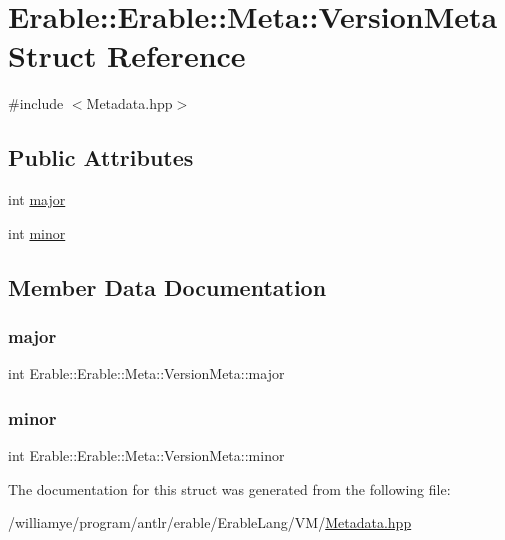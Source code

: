 \hypertarget{struct_erable_1_1_erable_1_1_meta_1_1_version_meta}{}\section{Erable\+::Erable\+::Meta\+::Version\+Meta Struct Reference}
\label{struct_erable_1_1_erable_1_1_meta_1_1_version_meta}


{\ttfamily \#include $<$Metadata.\+hpp$>$}

\subsection*{Public Attributes}
\begin{DoxyCompactItemize}
\item 
int \mbox{\hyperlink{struct_erable_1_1_erable_1_1_meta_1_1_version_meta_a7295ed6eb241d786c7cf94b9886d3a38}{major}}
\item 
int \mbox{\hyperlink{struct_erable_1_1_erable_1_1_meta_1_1_version_meta_a408a0b0d5c003f48d1e4386e9e0bac5d}{minor}}
\end{DoxyCompactItemize}


\subsection{Member Data Documentation}
\mbox{\label{struct_erable_1_1_erable_1_1_meta_1_1_version_meta_a7295ed6eb241d786c7cf94b9886d3a38}} 
\subsubsection{\texorpdfstring{major}{major}}
{\footnotesize\ttfamily int Erable\+::\+Erable\+::\+Meta\+::\+Version\+Meta\+::major}

\mbox{\label{struct_erable_1_1_erable_1_1_meta_1_1_version_meta_a408a0b0d5c003f48d1e4386e9e0bac5d}} 
\subsubsection{\texorpdfstring{minor}{minor}}
{\footnotesize\ttfamily int Erable\+::\+Erable\+::\+Meta\+::\+Version\+Meta\+::minor}



The documentation for this struct was generated from the following file\+:\begin{DoxyCompactItemize}
\item 
/williamye/program/antlr/erable/\+Erable\+Lang/\+V\+M/\mbox{\hyperlink{_metadata_8hpp}{Metadata.\+hpp}}\end{DoxyCompactItemize}
